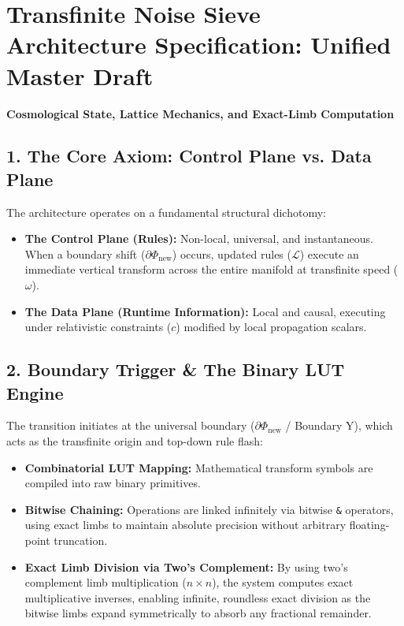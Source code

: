 \chapter{\texorpdfstring{Transfinite Noise Sieve Architecture Specification: Unified Master Draft}{Transfinite Noise Sieve Architecture Specification: Unified Master Draft}}
\label{chap:noise-sieve-4-laplace-demon}

\textbf{Cosmological State, Lattice Mechanics, and Exact-Limb Computation}

\medskip

\section{\texorpdfstring{1. The Core Axiom: Control Plane vs. Data Plane}{1. The Core Axiom: Control Plane vs. Data Plane}}

The architecture operates on a fundamental structural dichotomy:

\begin{itemize}
\item \textbf{The Control Plane (Rules):} Non-local, universal, and instantaneous. When a boundary shift (\(\partial\Phi_{\text{new}}\)) occurs, updated rules (\(\mathcal{L}\)) execute an immediate vertical transform across the entire manifold at transfinite speed (\(\omega\)).
\item \textbf{The Data Plane (Runtime Information):} Local and causal, executing under relativistic constraints (\(c\)) modified by local propagation scalars.
\end{itemize}

\medskip

\section{\texorpdfstring{2. Boundary Trigger \& The Binary LUT Engine}{2. Boundary Trigger \& The Binary LUT Engine}}

The transition initiates at the universal boundary (\(\partial\Phi_{\text{new}}\) / Boundary Y), which acts as the transfinite origin and top-down rule flash:

\begin{itemize}
\item \textbf{Combinatorial LUT Mapping:} Mathematical transform symbols are compiled into raw binary primitives.
\item \textbf{Bitwise Chaining:} Operations are linked infinitely via bitwise \texttt{\&} operators, using exact limbs to maintain absolute precision without arbitrary floating-point truncation.
\item \textbf{Exact Limb Division via Two's Complement:} By using two's complement limb multiplication (\(n \times n\)), the system computes exact multiplicative inverses, enabling infinite, roundless exact division as the bitwise limbs expand symmetrically to absorb any fractional remainder.
\end{itemize}

